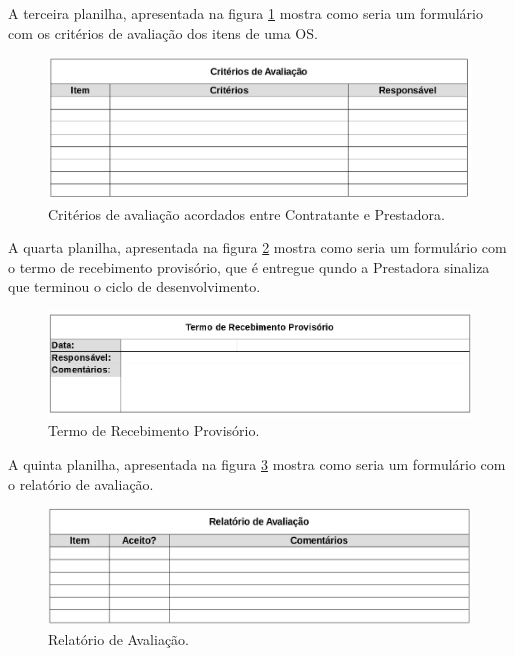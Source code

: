 A terceira planilha, apresentada na figura \ref{fig:prot_eval} mostra como
seria um formulário com os critérios de avaliação dos itens de uma OS.

\begin{figure}[H]
  \centering
  \includegraphics[keepaspectratio=true,scale=0.4]{figures/prot_eval}
  \caption{Critérios de avaliação acordados entre Contratante e Prestadora.}
  \label{fig:prot_eval}
\end{figure}

A quarta planilha, apresentada na figura \ref{fig:prot_ack_temp} mostra como
seria um formulário com o termo de recebimento provisório, que é entregue qundo
a Prestadora sinaliza que terminou o ciclo de desenvolvimento.

\begin{figure}[H]
  \centering
  \includegraphics[keepaspectratio=true,scale=0.4]{figures/prot_ack_temp}
  \caption{Termo de Recebimento Provisório.}
  \label{fig:prot_ack_temp}
\end{figure}

A quinta planilha, apresentada na figura \ref{fig:prot_eval_report} mostra como
seria um formulário com o relatório de avaliação.

\begin{figure}[H]
  \centering
  \includegraphics[keepaspectratio=true,scale=0.3]{figures/prot_eval_report}
  \caption{Relatório de Avaliação.}
  \label{fig:prot_eval_report}
\end{figure}

